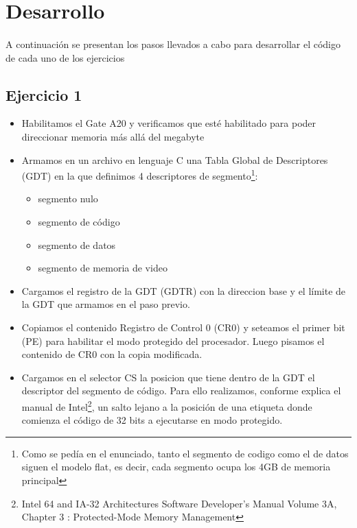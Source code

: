 \section{Desarrollo}
\paragraph{}
A continuaci\'on se presentan los pasos llevados a cabo para desarrollar el c\'odigo de cada uno de los ejercicios

\subsection{Ejercicio 1}
\begin{itemize}
 \item Habilitamos el Gate A20 y verificamos que est\'e habilitado para poder direccionar memoria m\'as all\'a del megabyte
 \item Armamos en un archivo en lenguaje C una Tabla Global de Descriptores (GDT) en la que definimos 4 descriptores de segmento\footnote{Como se ped\'ia en el enunciado, tanto el segmento de codigo como el de datos siguen el modelo flat, es decir, cada segmento ocupa los 4GB de memoria principal}: 
	\begin{itemize}
	\item segmento nulo
	\item segmento de c\'odigo
	\item segmento de datos
	\item segmento de memoria de video
	\end{itemize}

 \item Cargamos el registro de la GDT (GDTR) con la direccion base  y el l\'imite de la GDT que armamos en el paso previo.

 \item Copiamos el contenido Registro de Control 0 (CR0) y seteamos el primer bit (PE) para habilitar el modo protegido del procesador. Luego pisamos el contenido de CR0 con la copia modificada.

 \item Cargamos en el selector CS la posicion que tiene dentro de la GDT el descriptor del segmento de c\'odigo. Para ello realizamos, conforme explica el manual de Intel\footnote{Intel 64 and IA-32 Architectures Software Developer's Manual Volume 3A, Chapter 3 : Protected-Mode Memory Management}, un salto lejano a la posici\'on de una etiqueta donde comienza el c\'odigo de 32 bits a ejecutarse en modo protegido.


\end{itemize}

